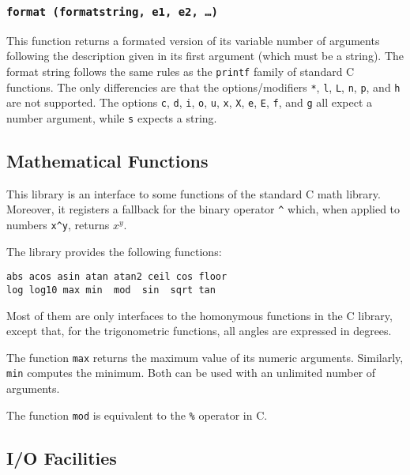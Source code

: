 \subsubsection*{{\tt format (formatstring, e1, e2, \ldots)}}
\label{format}
This function returns a formated version of its variable number of arguments
following the description given in its first argument (which must be a string). 
The format string follows the same rules as the \verb'printf' family of
standard C functions.
The only differencies are that the options/modifiers
 \verb'*', \verb'l', \verb'L', \verb'n', \verb'p',
 and \verb'h' are not supported.
The options \verb'c',  \verb'd',  \verb'i', \verb'o', \verb'u', 
\verb'x',  \verb'X', \verb'e',  \verb'E', \verb'f', and \verb'g' all
expect a number argument,
while \verb's' expects a string.


\subsection{Mathematical Functions} \label{mathlib}

This library is an interface to some functions of the standard C math library.
Moreover, it registers a fallback for the binary operator \verb'^' which,
when applied to numbers \verb'x^y', returns $x^y$.

The library provides the following functions:
\begin{verbatim}
abs acos asin atan atan2 ceil cos floor
log log10 max min  mod  sin  sqrt tan
\end{verbatim}
Most of them
are only interfaces to the homonymous functions in the C library,
except that, for the trigonometric functions,
all angles are expressed in degrees.

The function \verb'max' returns the maximum
value of its numeric arguments.
Similarly, \verb'min' computes the minimum.
Both can be used with an unlimited number of arguments.

The function \verb'mod' is equivalent to the \verb'%' operator in C.


\subsection{I/O Facilities} \label{libio}

